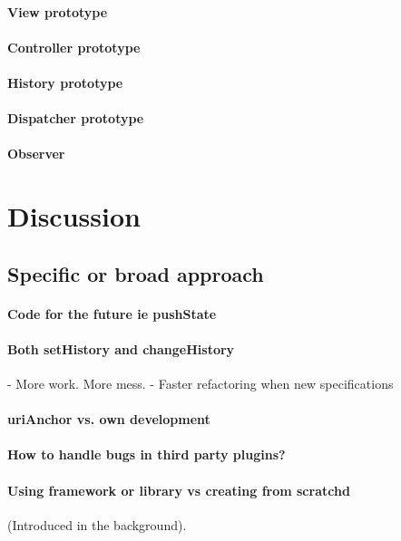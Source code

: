 \documentclass[english]{ifimaster}
\begin{document}
\subsubsection{View prototype}
\subsubsection{Controller prototype}
\subsubsection{History prototype}
\subsubsection{Dispatcher prototype}
\subsubsection{Observer}



\chapter{Discussion}
\section{Specific or broad approach}
\subsubsection{Code for the future ie pushState} {}
\subsubsection{Both setHistory and changeHistory} {}
 - More work. More mess.
 - Faster refactoring when new specifications
\subsubsection{uriAnchor vs. own development} 
\subsubsection{How to handle bugs in third party plugins?} 
\subsubsection{Using framework or library vs creating from scratchd}  (Introduced in the background).
\end{document}
